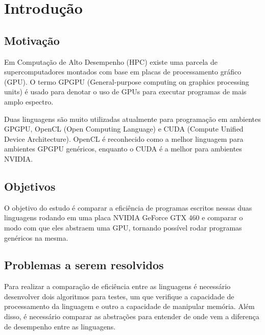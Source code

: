 \section{Introdução}
\subsection{Motivação}
Em Computação de Alto Desempenho (HPC) existe uma parcela de supercomputadores montados com base em placas
de processamento gráfico (GPU). O termo GPGPU (General-purpose computing on graphics processing units) é
usado para denotar o uso de GPUs para executar programas de mais amplo espectro.

Duas linguagens são muito utilizadas atualmente para programação em ambientes GPGPU, OpenCL (Open Computing Language) 
e CUDA (Compute Unified Device Architecture). OpenCL é reconhecido como a melhor linguagem para ambientes GPGPU
genéricos, enquanto o CUDA é a melhor para ambientes NVIDIA.

\subsection{Objetivos}
O objetivo do estudo é comparar a eficiência de programas escritos nessas duas linguagens rodando em uma placa NVIDIA GeForce GTX 460
e comparar o modo com que eles abstraem uma GPU, tornando possível rodar programas genéricos na mesma.

\subsection{Problemas a serem resolvidos}
Para realizar a comparação de eficiência entre as linguagens é necessário desenvolver dois algoritmos para testes, um que verifique
a capacidade de processamento da linguagem e outro a capacidade de manipular memória. Além disso, é necessário comparar as abstrações
para entender de onde vem a diferença de desempenho entre as linguagens.

